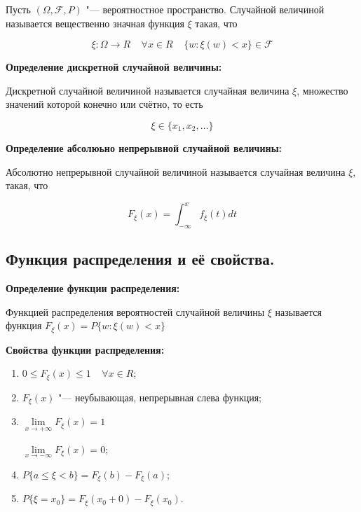     Пусть $(\Omega, \mathcal{F}, P)$ "---
    вероятностное пространство. Случайной 
    величиной называется вещественно значная
    функция $\xi$ такая, что

    \[
        \xi : \Omega \rightarrow R \;\;\;\;
        \forall x \in R \;\;\;\; \{w: \xi(w) < x\}
        \in \mathcal{F}
    \]
    \bigskip

\textbf{Определение дискретной случайной величины:}
    \smallskip
    
    Дискретной случайной величиной называется случайная величина $\xi$,
    множество значений которой конечно или счётно, то есть

    \[
        \xi \in \{x_1, x_2, \dots\}  
    \]
    \bigskip

\textbf{Определение абсолюьно непрерывной случайной величины:}
    \smallskip
    
    Абсолютно непрерывной случайной величиной называется случайная величина $\xi$,
    такая, что 

    \[
        F_{\xi}(x) = \int^{x}_{-\infty} f_{\xi}(t) dt  
    \]

\subsection{Функция распределения и её свойства.}

\textbf{Определение функции распределения:}
    \smallskip

    Функцией распределения вероятностей 
    случайной величины $\xi$ называется функция 
    $F_{\xi}(x) = P\{w : \xi (w) < x\}$
    \bigskip

\textbf{Свойства функции распределения:}
    \smallskip
    
    \begin{enumerate}
        \item{$0 \leq F_{\xi}(x) \leq 1 \;\;\;\;
        \forall x \in R$;}
        \item{$F_{\xi}(x)$ "--- неубывающая,
        непрерывная слева функция;}
        \item{$\lim\limits_{x \to +\infty} F_{\xi} (x) = 1$
        
        $\lim\limits_{x \to -\infty} F_{\xi} (x) = 0$;}
        \item{$P\{a \leq \xi < b\} = F_{\xi}(b) -
        F_{\xi}(a)$;}
        \item{$P\{\xi = x_0\} = F_{\xi}(x_0 + 0)
        - F_{\xi}(x_0)$.}
    \end{enumerate}
    \bigskip

